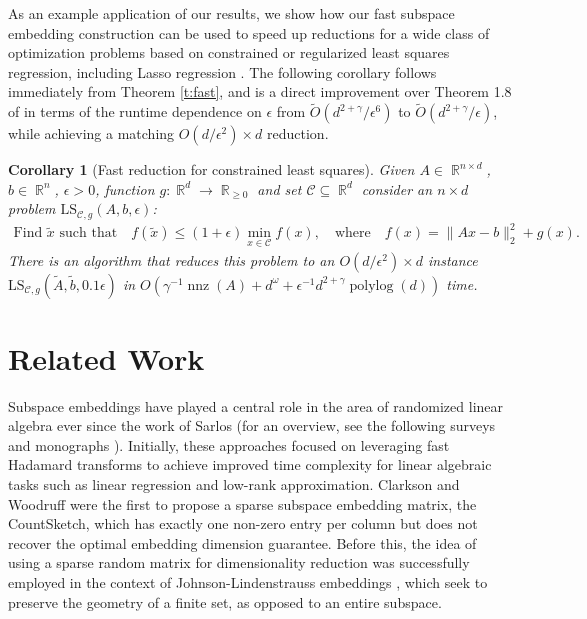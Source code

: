 \documentclass[11pt]{amsart}
\numberwithin{equation}{section}
\numberwithin{equation}{section}
\DeclareMathOperator{\R}{\mathbb{R}}
\DeclareMathOperator{\polylog}{polylog}
\DeclareMathOperator{\nnz}{nnz}
\newtheorem{corollary}[theorem]{Corollary}
\theoremstyle{remark}
\theoremstyle{definition}
\begin{document}
As an example application of our results, we show how our fast subspace embedding construction can be used to speed up reductions for a wide class of optimization problems based on constrained or regularized least squares regression, including Lasso regression \cite{bourgain2015toward}. The following corollary follows immediately from Theorem \ref{t:fast}, and is a direct improvement over Theorem 1.8 of \cite{chenakkod2024optimal} in terms of the runtime dependence on $\epsilon$ from $\tilde O(d^{2+\gamma}/\epsilon^6)$ to $\tilde O(d^{2+\gamma}/\epsilon)$, while achieving a matching $O(d/\epsilon^2)\times d$ reduction.
\begin{corollary}[Fast reduction for constrained least squares]\label{t:reduction}
   Given $A\in\R^{n\times d}$, $b\in\R^n$, $\epsilon>0$, function $g:\R^d\rightarrow\R_{\geq 0}$ and set
    $\mathcal C\subseteq\R^d$ consider an $n\times d$  problem $\mathrm{LS}_{\mathcal C,g}(A,b,\epsilon)$:
    \begin{align*}
    \text{Find $\tilde x$ such that}\quad f(\tilde x)\leq (1+\epsilon)\min_{x\in\mathcal C}
      f(x),\quad\text{where}\quad
      f(x) = \|Ax-b\|_2^2+ g(x).
    \end{align*}
    There is an algorithm that reduces this problem to an
    $O(d/\epsilon^2)\times d$ instance $\mathrm{LS}_{\mathcal C,g}(\tilde A,\tilde
    b,0.1\epsilon)$ in $O(\gamma^{-1}\nnz(A) + d^\omega +
    \epsilon^{-1}d^{2+\gamma}\polylog(d))$  time.
  \end{corollary}



\section{Related Work}

Subspace embeddings have played a central role in the area of randomized linear algebra ever since the work of Sarlos \cite{sarlos2006improved} (for an overview, see the following surveys and monographs \cite{woodruff2014sketching,drineas2016randnla,martinsson2020randomized,derezinski2024recent}). Initially, these approaches focused on leveraging fast Hadamard transforms \cite{ailon2009fast,tropp2011improved} to achieve improved time complexity for linear algebraic tasks such as linear regression and low-rank approximation. Clarkson and Woodruff \cite{clarkson2013low} were the first to propose a sparse subspace embedding matrix, the CountSketch, which has exactly one non-zero entry per column but does not recover the optimal embedding dimension guarantee. Before this, the idea of using a sparse random matrix for dimensionality reduction was successfully employed in the context of Johnson-Lindenstrauss embeddings \cite{dasgupta2010sparse,kane2014sparser}, which seek to preserve the geometry of a finite set, as opposed to an entire subspace. 
\end{document}

